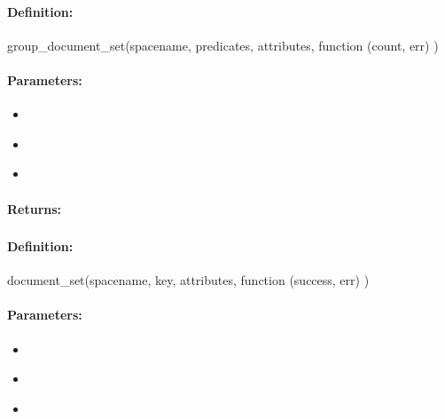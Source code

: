 \paragraph{Definition:}
\begin{javascriptcode}
group_document_set(spacename, predicates, attributes, function (count, err) {})
\end{javascriptcode}
\paragraph{Parameters:}
\begin{itemize}[noitemsep]
\item {}\\

\item {}\\

\item {}\\

\end{itemize}

\paragraph{Returns:}


\pagebreak
\subsubsection{}
\label{api:nodejs:document_set}


\paragraph{Definition:}
\begin{javascriptcode}
document_set(spacename, key, attributes, function (success, err) {})
\end{javascriptcode}
\paragraph{Parameters:}
\begin{itemize}[noitemsep]
\item {}\\

\item {}\\

\item {}\\

\end{itemize}

